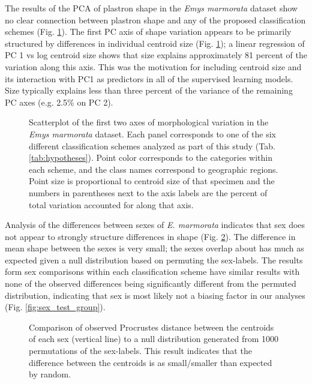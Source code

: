 \documentclass[10pt,letterpaper]{article}
\begin{document}
The results of the PCA of plastron shape in the \textit{Emys marmorata} dataset show no clear connection between plastron shape and any of the proposed classification schemes (Fig. \ref{fig:emys_pca}). The first PC axis of shape variation appears to be primarily structured by differences in individual centroid size (Fig. \ref{fig:emys_pca}); a linear regression of PC 1 vs log centroid size shows that size explains approximately 81 percent of the variation along this axis. This was the motivation for including centroid size and its interaction with PC1 as predictors in all of the supervised learning models. Size typically explains less than three percent of the variance of the remaining PC axes (e.g. 2.5\% on PC 2).

\begin{figure}[ht]
  \centering
  \caption{Scatterplot of the first two axes of morphological variation in the \textit{Emys marmorata} dataset. Each panel corresponds to one of the six different classification schemes analyzed as part of this study (Tab. \ref{tab:hypotheses}). Point color corresponds to the categories within each scheme, and the class names correspond to geographic regions. Point size is proportional to centroid size of that specimen and the numbers in parentheses next to the axis labels are the percent of total variation accounted for along that axis.}
  \label{fig:emys_pca}
\end{figure}


Analysis of the differences between sexes of \textit{E. marmorata} indicates that sex does not appear to strongly structure differences in shape (Fig. \ref{fig:sex_test}). The difference in mean shape between the sexes is very small; the sexes overlap about has much as expected given a null distribution based on permuting the sex-labels. The results form sex comparisons within each classification scheme have similar results with none of the observed differences being significantly different from the permuted distribution, indicating that sex is most likely not a biasing factor in our analyses (Fig. \ref{fig:sex_test_group}).

\begin{figure}[h]
  \centering
  \caption{Comparison of observed Procrustes distance between the centroids of each sex (vertical line) to a null distribution generated from 1000 permutations of the sex-labels. This result indicates that the difference between the centroids is as small/smaller than expected by random.}
  \label{fig:sex_test}
\end{figure}
\end{document}
